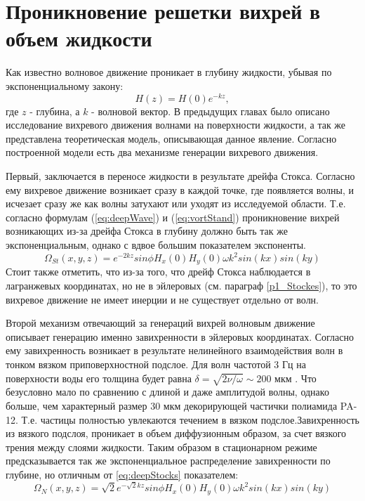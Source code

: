 \chapter{Проникновение решетки вихрей в объем жидкости} \label{chapt6}

Как известно \cite{land} волновое движение проникает в глубину жидкости, убывая по экспоненциальному закону:
\begin{equation}
 \label{eq:deepWave}
H(z) = H(0) e^{-kz},
\end{equation}
 где $z$ - глубина, а $k$ - волновой вектор. 
 В предыдущих главах было описано исследование вихревого движения волнами на поверхности жидкости, а так же представлена теоретическая модель, описывающая данное явление.
Согласно построенной модели есть два механизме генерации вихревого движения. 

	Первый, заключается в переносе жидкости в результате дрейфа Стокса. Согласно ему вихревое движение возникает сразу в каждой точке, где появляется волны, и исчезает сразу же как волны затухают или уходят из исследуемой области. Т.е. согласно формулам (\ref{eq:deepWave}) и (\ref{eq:vortStand}) проникновение вихрей возникающих из-за дрейфа Стокса в глубину должно быть так же экспоненциальным, однако с вдвое большим показателем экспоненты.
\begin{equation}
 \label{eq:deepStocks}
\Omega_{St}(x,y,z) = e^{-2kz} sin \phi H_x(0) H_y(0) \omega k^2 sin(kx)sin(ky)
\end{equation}
Стоит также отметить, что из-за того, что дрейф Стокса наблюдается в лагранжевых координатах, но не в эйлеровых (см. параграф \ref{p1_Stockes}), то это вихревое движение не имеет инерции и не существует отдельно от волн.

	Второй механизм отвечающий за генераций вихрей волновым движение описывает генерацию именно завихренности в эйлеровых координатах. Согласно ему завихренность возникает в результате нелинейного взаимодействия волн в тонком вязком приповерхностной подслое. Для волн частотой 3 Гц на поверхности воды его толщина будет равна $\delta = \sqrt{2 \nu / \omega} \sim 200 $ мкм  \cite{FalkovichBook}. Что безусловно мало по сравнению с длиной и даже амплитудой волны, однако больше, чем характерный размер 30 мкм декорирующей частички полиамида PA-12. Т.е. частицы полностью увлекаются течением в вязком подслое.Завихренность из вязкого подслоя, проникает в объем диффузионным образом, за счет вязкого трения между слоями жидкости. Таким образом в стационарном режиме предсказывается так же экспоненциальное распределение завихренности по глубине, но отличным от \ref{eq:deepStocks} показателем:
\begin{equation}
 \label{eq:deepEyler}
\Omega_N(x,y,z) = \sqrt{2}e^{-\sqrt{2}kz} sin \phi H_x(0) H_y(0) \omega k^2 sin(kx)sin(ky)
\end{equation}


